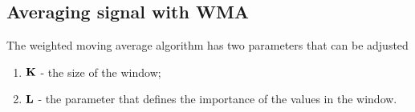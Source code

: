 \documentclass[a4paper,12pt,fleqn]{article}
\begin{document}
        \subsection{Averaging signal with WMA}

        \hspace{1em} The weighted moving average algorithm has two parameters that can be adjusted

        \begin{enumerate}
                \item \begin{math} \bold{K}\end{math} - the size of the window;
                \item \begin{math}
                    \bold{L}
                \end{math} - the parameter that defines the importance of the values in the window.

                \end{enumerate}
\end{document}
